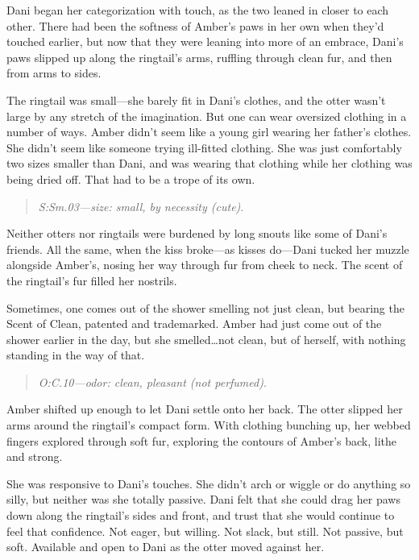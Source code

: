 Dani began her categorization with touch, as the two leaned in closer to each other. There had been the softness of Amber's paws in her own when they'd touched earlier, but now that they were leaning into more of an embrace, Dani's paws slipped up along the ringtail's arms, ruffling through clean fur, and then from arms to sides.

The ringtail was small---she barely fit in Dani's clothes, and the otter wasn't large by any stretch of the imagination. But one can wear oversized clothing in a number of ways. Amber didn't seem like a young girl wearing her father's clothes. She didn't seem like someone trying ill-fitted clothing. She was just comfortably two sizes smaller than Dani, and was wearing that clothing while her clothing was being dried off. That had to be a trope of its own.

\begin{quote}
\emph{S:Sm.03---size: small, by necessity (cute)}.
\end{quote}

Neither otters nor ringtails were burdened by long snouts like some of Dani's friends. All the same, when the kiss broke---as kisses do---Dani tucked her muzzle alongside Amber's, nosing her way through fur from cheek to neck. The scent of the ringtail's fur filled her nostrils.

Sometimes, one comes out of the shower smelling not just clean, but bearing the Scent of Clean, patented and trademarked. Amber had just come out of the shower earlier in the day, but she smelled\ldots{}not clean, but of herself, with nothing standing in the way of that.

\begin{quote}
\emph{O:C.10---odor: clean, pleasant (not perfumed)}.
\end{quote}

Amber shifted up enough to let Dani settle onto her back. The otter slipped her arms around the ringtail's compact form. With clothing bunching up, her webbed fingers explored through soft fur, exploring the contours of Amber's back, lithe and strong.

She was responsive to Dani's touches. She didn't arch or wiggle or do anything so silly, but neither was she totally passive. Dani felt that she could drag her paws down along the ringtail's sides and front, and trust that she would continue to feel that confidence. Not eager, but willing. Not slack, but still. Not passive, but soft. Available and open to Dani as the otter moved against her.

